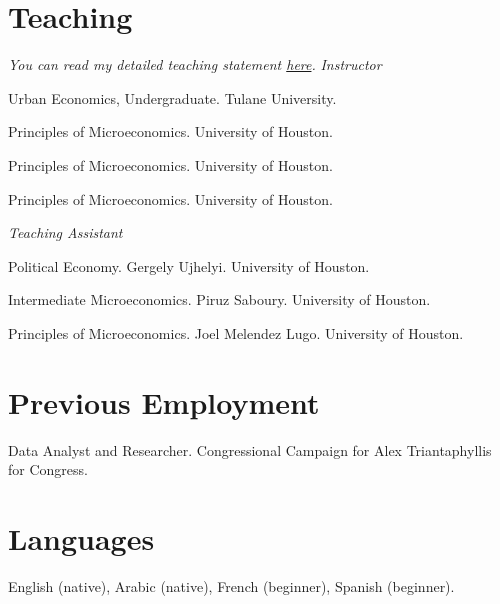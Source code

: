 \documentclass[letterpaper]{article}
\renewenvironment{itemize}{
  \begin{list}{}{
    \setlength{\leftmargin}{1.5em}
  }
}{
  \end{list}
}
\begin{document}
\vspace{2 mm}

\section*{Teaching}
\vspace{2 mm}
\textit{You can read my detailed teaching statement \href{https://hhadah.github.io/statements/Hadah_Teaching.pdf}{here}.}
\textit{Instructor}
\begin{itemize}
\item {}Urban Economics, Undergraduate. Tulane University.
\item {}Principles of Microeconomics. University of Houston.
\item {}Principles of Microeconomics. University of Houston.
\item {}Principles of Microeconomics. University of Houston.

\end{itemize}
\textit{Teaching Assistant}
\begin{itemize}
\item {}Political Economy. Gergely Ujhelyi. University of Houston.
\item {}Intermediate Microeconomics. Piruz Saboury. University of Houston.
\item {}Principles of Microeconomics. Joel Melendez Lugo. University of Houston.

\end{itemize}
\vspace{2 mm}


\section*{Previous Employment}
\vspace{2 mm}
\begin{itemize}
\item {}Data Analyst and Researcher. Congressional Campaign for Alex Triantaphyllis for Congress.
\end{itemize}
\vspace{2 mm}

\section*{Languages}
\vspace{2 mm}
{\makebox[2.3cm]{\hfill}}English (native), Arabic (native), French (beginner), Spanish (beginner).
\vspace{2 mm}
\end{document}
